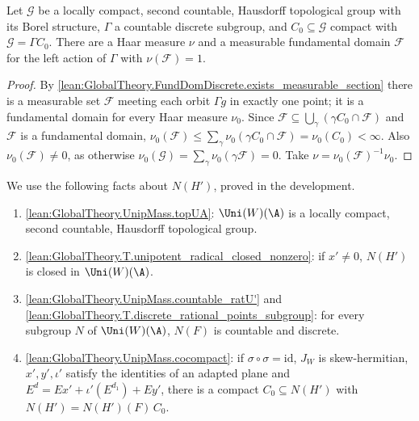 \begin{lemma}\label{pf:thmK-cone:haarfd}
Let $\mathcal G$ be a locally compact, second countable, Hausdorff topological group with its Borel structure,
$\Gamma$ a countable discrete subgroup, and $C_0\subseteq\mathcal G$ compact with $\mathcal G=\Gamma C_0$.  There are a
Haar measure $\nu$ and a measurable fundamental domain $\mathcal F$ for the left action of $\Gamma$ with
$\nu(\mathcal F)=1$.
\end{lemma}

\begin{proof}
By \cref{lean:GlobalTheory.FundDomDiscrete.exists_measurable_section} there is a measurable set $\mathcal F$ meeting
each orbit $\Gamma g$ in exactly one point; it is a fundamental domain for every Haar measure $\nu_0$.  Since
$\mathcal F\subseteq\bigcup_\gamma(\gamma C_0\cap\mathcal F)$ and $\mathcal F$ is a fundamental domain,
$\nu_0(\mathcal F)\le\sum_\gamma\nu_0(\gamma C_0\cap\mathcal F)=\nu_0(C_0)<\infty$.  Also $\nu_0(\mathcal F)\neq0$, as
otherwise $\nu_0(\mathcal G)=\sum_\gamma\nu_0(\gamma\mathcal F)=0$.  Take $\nu=\nu_0(\mathcal F)^{-1}\nu_0$.
\end{proof}

We use the following facts about $N(H')$, proved in the development.
\begin{enumerate}[label=\textup{(D\arabic*)},ref=\textup{(D\arabic*)},series=thmKconeD]
\item\label{pf:thmK-cone:D-top} \cref{lean:GlobalTheory.UnipMass.topUA}: $\Uni(W)(\A)$ is a locally compact, second
  countable, Hausdorff topological group.
\item\label{pf:thmK-cone:D-closed} \cref{lean:GlobalTheory.T.unipotent_radical_closed_nonzero}: if $x'\neq0$,
  $N(H')$ is closed in $\Uni(W)(\A)$.
\item\label{pf:thmK-cone:D-discrete} \cref{lean:GlobalTheory.UnipMass.countable_ratU'} and
  \cref{lean:GlobalTheory.T.discrete_rational_points_subgroup}: for every subgroup $N$ of $\Uni(W)(\A)$, $N(F)$ is
  countable and discrete.
\item\label{pf:thmK-cone:D-cocompact} \cref{lean:GlobalTheory.UnipMass.cocompact}: if $\sigma\circ\sigma=\mathrm{id}$,
  $J_W$ is skew-hermitian, $x',y',\iota'$ satisfy the identities of an adapted plane and
  $E^d=Ex'+\iota'(E^{d_1})+Ey'$, there is a compact $C_0\subseteq N(H')$ with $N(H')=N(H')(F)\,C_0$.
\end{enumerate}

